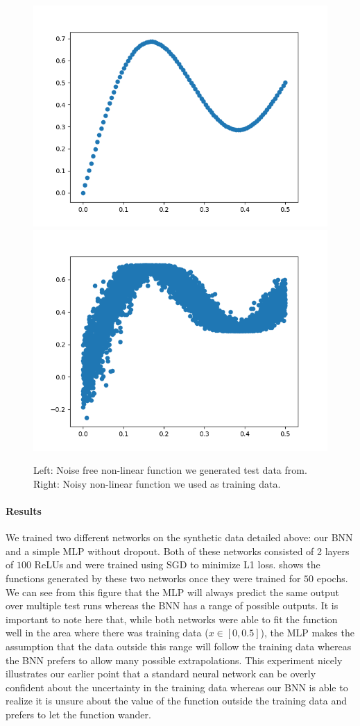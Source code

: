 \documentclass[11pt]{article}
\begin{document}
\begin{figure}
  \centering
  \includegraphics[width=.49\textwidth]{figures/regression_curve.png}
  \includegraphics[width=.49\textwidth]{figures/regression_curve_with_noise.png}
  \caption{Left: Noise free non-linear function we generated test data from.
  Right: Noisy non-linear function we used as training
  data.}\label{fig:reg_syth_data}
\end{figure}

\paragraph{Results} 

We trained two different networks on the synthetic data detailed above: our BNN
and a simple MLP without dropout. Both of these networks consisted of
2 layers of $100$ ReLUs and were trained using SGD to minimize L1 loss.
   shows the functions generated by these two networks
  once they were trained for $50$ epochs. We can see from this figure that the
  MLP will always predict the same output over multiple test runs whereas the
  BNN has a range of possible outputs. It is important to note here that, while
  both networks were able to fit the function well in the area where there was
  training data ($x\in[0, 0.5]$), the MLP makes the assumption that the data
  outside this range will follow the training data whereas the BNN prefers to
  allow many possible extrapolations. This experiment nicely illustrates our
  earlier point that a standard neural network can be overly confident about
  the uncertainty in the training data whereas our BNN is able to realize it
  is unsure about the value of the function outside the training data and
  prefers to let the function wander.
\end{document}
